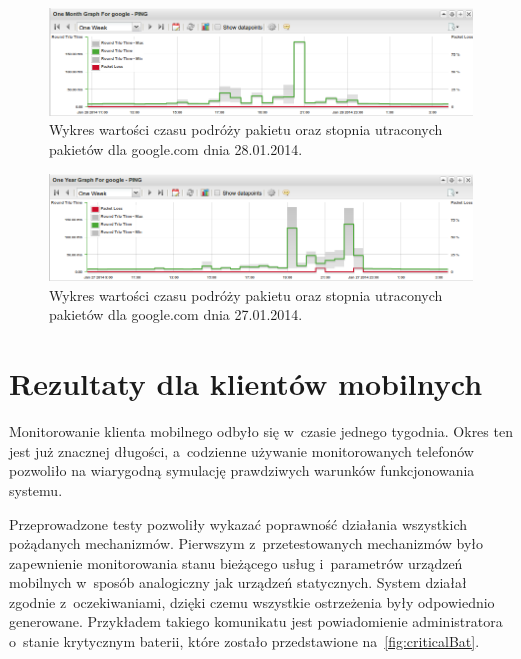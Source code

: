 \begin{figure}[H]
  \caption{Wykres wartości czasu podróży pakietu oraz stopnia
    utraconych pakietów dla google.com dnia 28.01.2014.}
  \label{fig:google2801}
  \centering
\includegraphics[width=1\textwidth]{img/google2801.png}
\end{figure}

\begin{figure}[H]
  \caption{Wykres wartości czasu podróży pakietu oraz stopnia
    utraconych pakietów dla google.com dnia 27.01.2014.}
  \label{fig:google2701}
  \centering
\includegraphics[width=1\textwidth]{img/google2701.png}
\end{figure}


\section[Klient mobilny][Rezultaty dla klientów mobilnych]{Rezultaty dla klientów mobilnych}

Monitorowanie klienta mobilnego odbyło się w~czasie jednego
tygodnia. Okres ten jest już znacznej długości, a~codzienne używanie
monitorowanych telefonów pozwoliło na wiarygodną symulację prawdziwych
warunków funkcjonowania systemu.

Przeprowadzone testy pozwoliły wykazać poprawność działania wszystkich
pożądanych mechanizmów. Pierwszym z~przetestowanych mechanizmów było
zapewnienie monitorowania stanu bieżącego usług i~parametrów urządzeń
mobilnych w~sposób analogiczny jak urządzeń statycznych. System
działał zgodnie z~oczekiwaniami, dzięki czemu wszystkie ostrzeżenia
były odpowiednio generowane. Przykładem takiego komunikatu jest
powiadomienie administratora o~stanie krytycznym baterii, które
zostało przedstawione na~\ref{fig:criticalBat}.

